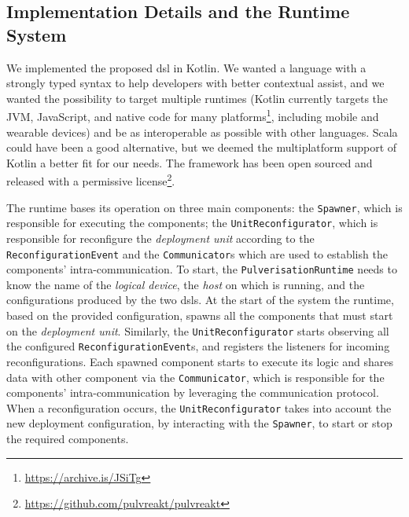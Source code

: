 \documentclass[conference]{IEEEtran}
\begin{document}
% 

\subsection{Implementation Details and the Runtime System}
\label{sec:contrib:runtime}

We implemented the proposed \ac{dsl} in Kotlin.
%
We wanted a language with a strongly typed syntax to help developers with better contextual assist,
and we wanted the possibility to target multiple runtimes
(Kotlin currently targets the JVM, JavaScript, and native code for many platforms\footnote{\url{https://archive.is/JSiTg}},
including mobile and wearable devices)
and be as interoperable as possible with other languages.
%
Scala could have been a good alternative,
but we deemed the multiplatform support of Kotlin a better fit for our needs.
%
The framework has been open sourced and released with a permissive license\footnote{\url{https://github.com/pulvreakt/pulvreakt}}.

The runtime bases its operation on three main components:
the \texttt{Spawner}, which is responsible for executing the components;
the \texttt{UnitReconfigurator}, which is responsible for reconfigure the \emph{deployment unit}
according to the \texttt{ReconfigurationEvent}
and the \texttt{Communicator}s which are used to establish the components' intra-communication.
%
To start, the \texttt{PulverisationRuntime} needs to know the name of the \emph{logical device},
the \emph{host} on which is running, and the configurations produced by the two \ac{dsl}s.
%
At the start of the system the runtime,
based on the provided configuration,
spawns all the components that must start on the \emph{deployment unit}.
%
Similarly, the \texttt{UnitReconfigurator} starts observing all the configured \texttt{ReconfigurationEvent}s,
and registers the listeners for incoming reconfigurations.
%
Each spawned component starts to execute its logic and shares data with other component via the \texttt{Communicator},
which is responsible for the components' intra-communication by leveraging the communication protocol.
%
When a reconfiguration occurs, the \texttt{UnitReconfigurator} takes into account the new deployment configuration,
by interacting with the \texttt{Spawner}, to start or stop the required components.
\end{document}
